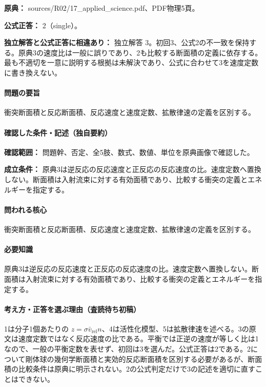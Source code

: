 \noindent\textbf{原典：} sources/R02/17\_applied\_science.pdf、PDF物理5頁。

\textbf{公式正答：} 2（single）。

\par\textbf{独立解答と公式正答に相違あり：} 独立解答 3。初回3、公式2の不一致を保持する。原典3の速度比は一般に誤りであり、2も比較する断面積の定義に依存する。最も不適切を一意に説明する根拠は未解決であり、公式に合わせて3を速度定数に書き換えない。

\paragraph{問題の要旨} 衝突断面積と反応断面積、反応速度と速度定数、拡散律速の定義を区別する。

\paragraph{確認した条件・記述（独自要約）}\mbox{}\par

\noindent\textbf{確認範囲：} 問題幹、否定、全5肢、数式、数値、単位を原典画像で確認した。\par

\noindent\textbf{成立条件：} 原典3は逆反応の反応速度と正反応の反応速度の比。速度定数へ置換しない。断面積は入射流束に対する有効面積であり、比較する衝突の定義とエネルギーを指定する。\par

\paragraph{問われる核心} 衝突断面積と反応断面積、反応速度と速度定数、拡散律速の定義を区別する。

\paragraph{必要知識} 原典3は逆反応の反応速度と正反応の反応速度の比。速度定数へ置換しない。断面積は入射流束に対する有効面積であり、比較する衝突の定義とエネルギーを指定する。

\paragraph{考え方・正答を選ぶ理由（査読待ち初稿）} 1は分子1個あたりの \(z=\sigma\bar v_{\mathrm{rel}}n\)、4は活性化模型、5は拡散律速を述べる。3の原文は速度定数ではなく反応速度の比である。平衡では正逆の速度が等しく比は1なので、一般の平衡定数を表せず、初回は3を選んだ。公式正答は2である。2について剛体球の幾何学断面積と実効的反応断面積を区別する必要があるが、断面積の比較条件は原典に明示されない。2の公式判定だけで3の記述を適切に直すことはできない。

